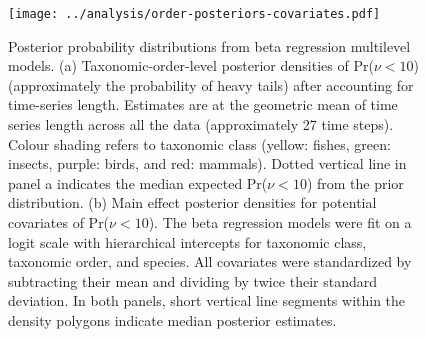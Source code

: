 \begin{figure}[htbp]
\begin{center}
\texttt{[image: ../analysis/order-posteriors-covariates.pdf]}

\caption{Posterior probability distributions from beta regression multilevel
  models. (a) Taxonomic-order-level posterior densities of Pr($\nu < 10$)
  (approximately the probability of heavy tails) after accounting for
  time-series length. Estimates are at the geometric mean of time series
  length across all the data (approximately 27 time steps). Colour shading
  refers to taxonomic class (yellow: fishes, green: insects, purple: birds,
  and red: mammals). Dotted vertical line in panel a indicates the median
  expected Pr($\nu < 10$) from the prior distribution. (b) Main effect
  posterior densities for potential covariates of Pr($\nu < 10$). The beta
  regression models were fit on a logit scale with hierarchical intercepts for
  taxonomic class, taxonomic order, and species. All covariates were
  standardized by subtracting their mean and dividing by twice their standard
  deviation. In both panels, short vertical line segments within the density
  polygons indicate median posterior estimates.}

\label{fig:posteriors}
\end{center}
\end{figure}
